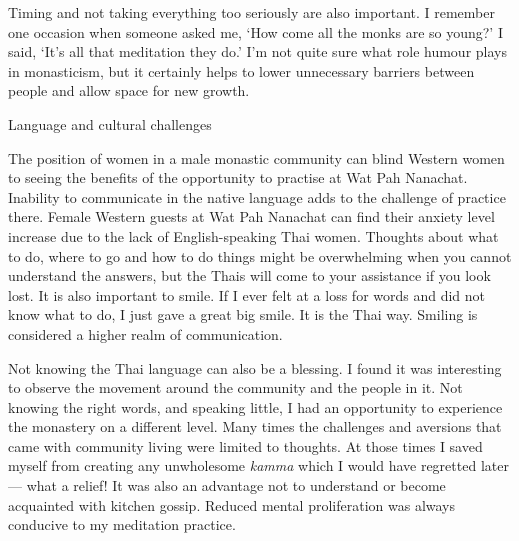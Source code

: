 Timing and not taking everything too seriously are also important. I
remember one occasion when someone asked me, `How come all the monks are
so young?' I said, `It's all that meditation they do.' I'm not quite
sure what role humour plays in monasticism, but it certainly helps to
lower unnecessary barriers between people and allow space for new
growth.

Language and cultural challenges

The position of women in a male monastic community can blind Western
women to seeing the benefits of the opportunity to practise at Wat Pah
Nanachat. Inability to communicate in the native language adds to the
challenge of practice there. Female Western guests at Wat Pah Nanachat
can find their anxiety level increase due to the lack of
English-speaking Thai women. Thoughts about what to do, where to go and
how to do things might be overwhelming when you cannot understand the
answers, but the Thais will come to your assistance if you look lost. It
is also important to smile. If I ever felt at a loss for words and did
not know what to do, I just gave a great big smile. It is the Thai way.
Smiling is considered a higher realm of communication.

Not knowing the Thai language can also be a blessing. I found it was
interesting to observe the movement around the community and the people
in it. Not knowing the right words, and speaking little, I had an
opportunity to experience the monastery on a different level. Many times
the challenges and aversions that came with community living were
limited to thoughts. At those times I saved myself from creating any
unwholesome \emph{kamma} which I would have regretted later --- what a
relief! It was also an advantage not to understand or become acquainted
with kitchen gossip. Reduced mental proliferation was always conducive
to my meditation practice.

